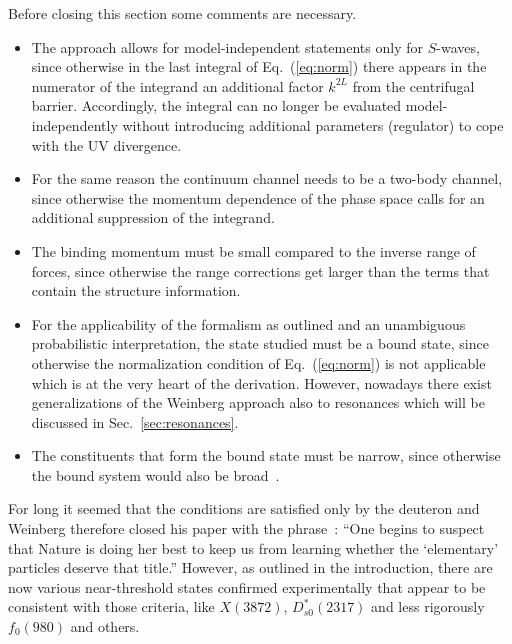 Before closing this section some comments are necessary.
\begin{itemize}
\item The approach allows for model-independent statements only for $S$-waves,
since otherwise in the last integral of Eq.~(\ref{eq:norm}) there appears in the
numerator of the integrand an additional factor $k^{2L}$ from the centrifugal 
barrier. Accordingly, the integral can no longer be evaluated
model-independently without introducing additional parameters (regulator) to 
cope with the UV divergence.

\item For the same reason the continuum channel needs to be a two-body channel,
since otherwise the momentum dependence of the phase space calls for an 
additional suppression of the integrand. 

\item The binding momentum must be small compared to the inverse range of
forces, since otherwise the range corrections get larger than the terms that
contain the structure information.

\item For the applicability  of the formalism as outlined and an unambiguous
probabilistic interpretation, the state studied must be a bound state, since
otherwise the normalization condition of Eq.~(\ref{eq:norm}) is not applicable
which is at the very heart of the derivation.
However, nowadays there exist generalizations of the Weinberg approach also to
resonances which will be discussed in Sec.~\ref{sec:resonances}.

\item The constituents that form the bound state must be
narrow, since otherwise the bound system would also be
broad~\cite{Filin:2010se,Guo:2011dd}.
\end{itemize}

For long it seemed that the conditions are satisfied only by the deuteron and
Weinberg therefore closed his paper with the phrase~\cite{Weinberg:1965zz}:
``One begins to suspect that Nature is doing her best to keep us from learning
whether the `elementary' particles deserve that title.'' However, as outlined in
the introduction, there are now various near-threshold states confirmed
experimentally that appear to be consistent with those criteria, like $X(3872)$,
$D_{s0}^*(2317)$ and less rigorously $f_0(980)$ and others.

